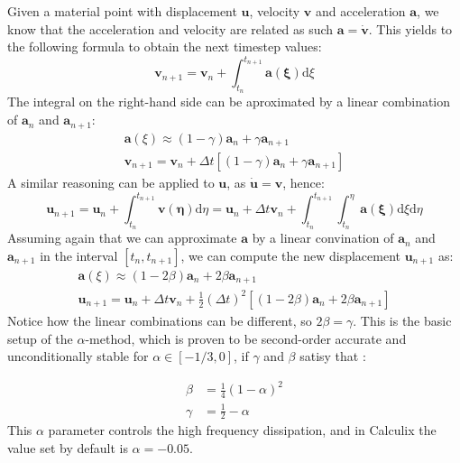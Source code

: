 \documentclass[
  english,        %
  font=times,     %
  onecolumn,      %
]{tumarticle}
\begin{document}
Given a material point with displacement $\boldsymbol{u}$, velocity $\boldsymbol{v}$ and acceleration $\boldsymbol{a}$, we know that the acceleration and velocity are related as such $\boldsymbol{a} = \dot{\boldsymbol{v}}$. This yields to the following formula to obtain the next timestep values:
\begin{equation}
    \boldsymbol{v}_{n+1} = \boldsymbol{v}_n + \int_{t_n}^{t_{n+1}} \boldsymbol{a(\xi)} \text{d}\xi
\end{equation}
The integral on the right-hand side can be aproximated by a linear combination of $ \boldsymbol{a}_n$ and $\boldsymbol{a}_{n+1}$:
\begin{gather}
    \boldsymbol{a}(\xi) \approx  (1 - \gamma) \boldsymbol{a}_n + \gamma \boldsymbol{a}_{n+1}\\
    \boldsymbol{v}_{n+1} = \boldsymbol{v}_n + \Delta t \left[ (1 - \gamma) \boldsymbol{a}_n + \gamma \boldsymbol{a}_{n+1} \right]
\end{gather} 
A similar reasoning can be applied to $\boldsymbol{u}$, as $\boldsymbol{\dot{u}} = \boldsymbol{v}$, hence:
\begin{equation}
    \boldsymbol{u}_{n+1} 
    = \boldsymbol{u}_n + \int_{t_n}^{t_{n+1}} \boldsymbol{v(\eta)}  \text{d}\eta 
    = \boldsymbol{u}_n + \Delta t \boldsymbol{v}_n + \int_{t_n}^{t_{n+1}} \int_{t_n}^{\eta} \boldsymbol{a(\xi)} \text{d}\xi \text{d}\eta 
\end{equation}
Assuming again that we can approximate $\boldsymbol{a}$ by a linear convination of $ \boldsymbol{a}_n$ and $\boldsymbol{a}_{n+1}$ in the interval $\left[ t_n, t_{n+1} \right]$, we can compute the new displacement $\boldsymbol{u}_{n+1}$ as:
\begin{gather}
    \boldsymbol{a}(\xi) \approx  (1 - 2\beta) \boldsymbol{a}_n + 2\beta \boldsymbol{a}_{n+1}\\
    \boldsymbol{u}_{n+1} = \boldsymbol{u}_n + \Delta t \boldsymbol{v}_n
    + \frac{1}{2} (\Delta t)^2 \left[ (1 - 2\beta) \boldsymbol{a}_n + 2\beta \boldsymbol{a}_{n+1} \right]
\end{gather} 
Notice how the linear combinations can be different, so $2\beta = \gamma$. This is the basic setup of the $\alpha$-method, which is proven to be second-order accurate and unconditionally stable for $\alpha \in [-1/3, 0]$, if $\gamma$ and $\beta$ satisy that \cite{dhondt2004finite}:

\begin{align}
    \beta &= \frac{1}{4}(1 - \alpha)^2 \\
    \gamma &= \frac{1}{2} - \alpha
\end{align}
This $\alpha$ parameter controls the high frequency dissipation, and in Calculix the value set by default is $\alpha=-0.05$.
\end{document}
